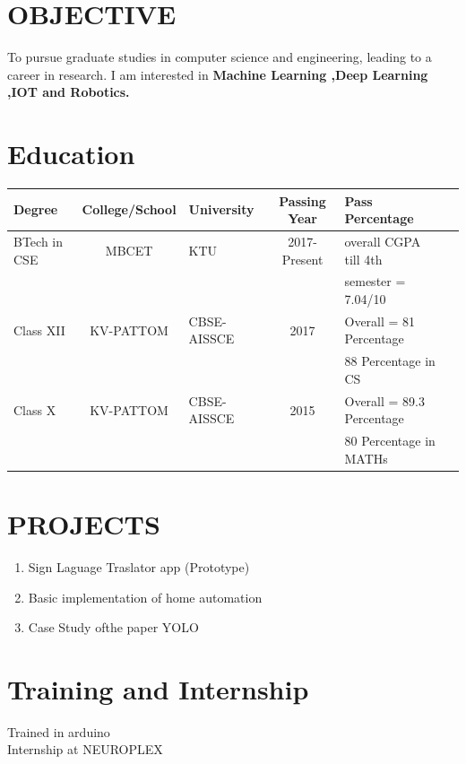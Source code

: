 \documentclass[margin,line]{res}
\begin{document}
\begin{resume}
\begin{tabular}{@{}p{3.5in}p{3in}}
		\end{tabular}
		
		\vspace{.1in}
	\section{\sc OBJECTIVE}

To pursue graduate studies in computer science and engineering, leading to a career in research. I am interested in \bf Machine Learning ,Deep Learning ,IOT and Robotics. 

\vspace{.1in}
\section{\sc Education}
\begin{tabular}{|l|c|l|c|l|c|}\hline
	\bf Degree&\bf College/School&\bf University&\bf Passing Year&\bf Pass Percentage \\ \hline
	BTech in CSE
	&MBCET & KTU & 2017-Present&overall CGPA till 4th\\ &&&&semester  = 7.04/10 \\ \hline
	Class XII
	&KV-PATTOM & CBSE-AISSCE  & 2017& Overall = 81 Percentage \\&&&&88 Percentage in CS 
	
	\\ \hline
	Class X
	&KV-PATTOM & CBSE-AISSCE  & 2015& Overall = 89.3 Percentage \\&&&&80 Percentage in MATHs 
	
	\\ \hline
\end{tabular}	
\section{\sc PROJECTS}

\begin{enumerate} %
	\item Sign Laguage Traslator app (Prototype) \\
	\item Basic implementation of home automation\\
	\item Case Study ofthe paper YOLO\\
	
\end{enumerate}

\section{\sc Training and Internship}
Trained in arduino \\
Internship at NEUROPLEX \\

\end{resume}
\end{document}
